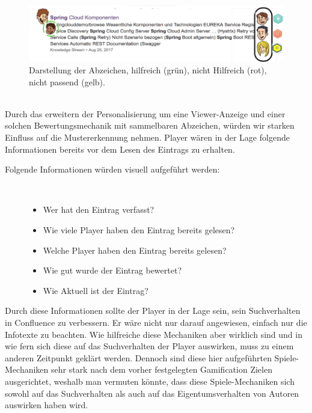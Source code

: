 \documentclass[a4paper,12pt,twoside]{scrartcl}
\begin{document}
\\
\begin{figure}[h!]
\begin{center}
\includegraphics[scale = 0.5]{Bilder/NeueSuchErgebnisseSupporterBadges.png}
\caption{Darstellung der Abzeichen, hilfreich (grün), nicht Hilfreich (rot), nicht passend (gelb).}
\label{NeueSuchErgebnisseSupporterBadges}
\end{center}
\end{figure} 
\\
Durch das erweitern der Personalisierung um eine Viewer-Anzeige und einer solchen Bewertungsmechanik mit sammelbaren Abzeichen, würden wir starken Einfluss auf die Mustererkennung nehmen. Player wären in der Lage folgende Informationen bereits vor dem Lesen des Eintrags zu erhalten.
\begin{description}
   \item[Folgende Informationen würden visuell aufgeführt werden:]~\par
   \begin{itemize}
      \item Wer hat den Eintrag verfasst?
      \item Wie viele Player haben den Eintrag bereits gelesen?
      \item Welche Player haben den Eintrag bereits gelesen?
      \item Wie gut wurde der Eintrag bewertet?
      \item Wie Aktuell ist der Eintrag?
   \end{itemize}
\end{description} 
Durch diese Informationen sollte der Player in der Lage sein, sein Suchverhalten in Confluence zu verbessern. Er wäre nicht nur darauf angewiesen, einfach nur die Infotexte zu beachten. Wie hilfreiche diese Mechaniken aber wirklich sind und in wie fern sich diese auf das Suchverhalten der Player auswirken, muss zu einem anderen Zeitpunkt geklärt werden. Dennoch sind diese hier aufgeführten Spiele-Mechaniken sehr stark nach dem vorher festgelegten Gamification Zielen ausgerichtet, weshalb man vermuten könnte, dass diese Spiele-Mechaniken sich sowohl auf das Suchverhalten als auch auf das Eigentumsverhalten von Autoren auswirken haben wird.
\end{document}
